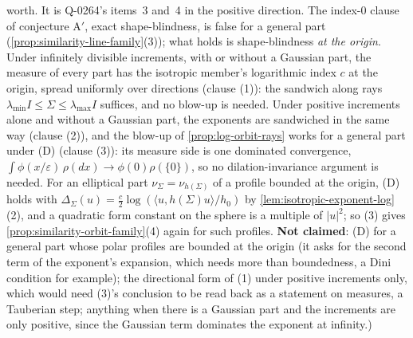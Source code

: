 \begin{proposition}
{{worth.} It is Q-0264's items~3 and~4 in the positive direction. The index-$0$ clause of conjecture A$'$,
exact shape-blindness, is false for a general part (\ref{prop:similarity-line-family}(3)); what holds is
shape-blindness \emph{at the origin}. Under infinitely divisible increments, with or without a Gaussian
part, the \Levy{} measure of every part has the isotropic member's logarithmic index $c$ at the origin,
spread uniformly over directions (clause (1)): the sandwich along rays $\lambda_{\min}I \le \Sigma \le
\lambda_{\max}I$ suffices, and no blow-up is needed. Under positive increments alone and without a Gaussian
part, the exponents are sandwiched in the same way (clause (2)), and the blow-up of
\ref{prop:log-orbit-rays} works for a general part under (D) (clause (3)): its measure side is one
dominated convergence, $\int\phi(x/\varepsilon)\,\rho(dx) \to \phi(0)\rho(\{0\})$, so no dilation-invariance argument
is needed. For an elliptical part $\nu_\Sigma = \nu_{h(\Sigma)}$ of a profile bounded at the origin, (D) holds
with $\Delta_\Sigma(u) = \tfrac c2\log(\langle u,h(\Sigma)u\rangle/h_0)$ by \ref{lem:isotropic-exponent-log}(2), and a
quadratic form constant on the sphere is a multiple of $|u|^2$; so (3) gives
\ref{prop:similarity-orbit-family}(4) again for such profiles. \textbf{Not claimed}: (D) for a general part
whose polar profiles are bounded at the origin (it asks for the second term of the exponent's expansion,
which needs more than boundedness, a Dini condition for example); the directional form of (1) under
positive increments only, which would need (3)'s conclusion to be read back as a statement on \Levy{}
measures, a Tauberian step; anything when there is a Gaussian part and the increments are only positive,
since the Gaussian term dominates the exponent at infinity.)}
\end{proposition}

